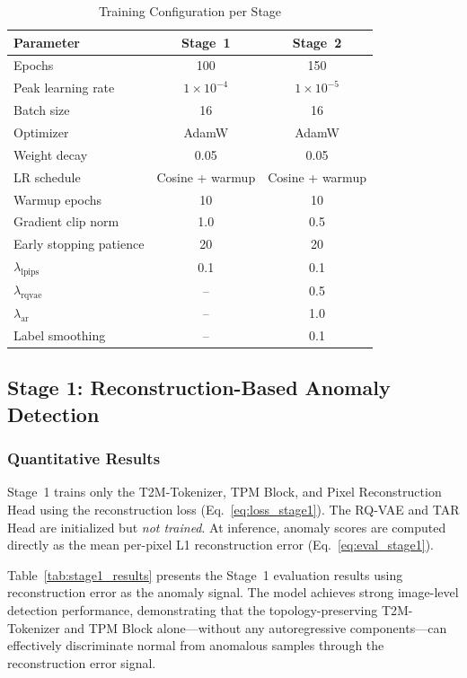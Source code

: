\documentclass[lettersize,journal]{IEEEtran}
\begin{document}
\begin{table}[!t]
\caption{Training Configuration per Stage\label{tab:train_config}}
\centering
\begin{tabular}{@{}lcc@{}}
\toprule
\textbf{Parameter} & \textbf{Stage~1} & \textbf{Stage~2} \\
\midrule
Epochs & 100 & 150 \\
Peak learning rate & $1 \times 10^{-4}$ & $1 \times 10^{-5}$ \\
Batch size & 16 & 16 \\
Optimizer & AdamW & AdamW \\
Weight decay & 0.05 & 0.05 \\
LR schedule & Cosine + warmup & Cosine + warmup \\
Warmup epochs & 10 & 10 \\
Gradient clip norm & 1.0 & 0.5 \\
Early stopping patience & 20 & 20 \\
$\lambda_{\text{lpips}}$ & 0.1 & 0.1 \\
$\lambda_{\text{rqvae}}$ & -- & 0.5 \\
$\lambda_{\text{ar}}$ & -- & 1.0 \\
Label smoothing & -- & 0.1 \\
\bottomrule
\end{tabular}
\end{table}

\subsection{Stage 1: Reconstruction-Based Anomaly Detection}

\subsubsection{Quantitative Results}

Stage~1 trains only the T2M-Tokenizer, TPM Block, and Pixel Reconstruction Head using the reconstruction loss (Eq.~\ref{eq:loss_stage1}). The RQ-VAE and TAR Head are initialized but \emph{not trained}. At inference, anomaly scores are computed directly as the mean per-pixel L1 reconstruction error (Eq.~\ref{eq:eval_stage1}).

Table~\ref{tab:stage1_results} presents the Stage~1 evaluation results using reconstruction error as the anomaly signal. The model achieves strong image-level detection performance, demonstrating that the topology-preserving T2M-Tokenizer and TPM Block alone---without any autoregressive components---can effectively discriminate normal from anomalous samples through the reconstruction error signal.
\end{document}
